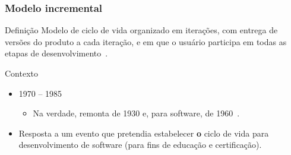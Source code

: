 \begin{frame}[parent={ie:agenda}, hasnext=true, hasprev=false]
	\frametitle{Modelo incremental}

	\begin{block:concept}{Definição}
		Modelo de ciclo de vida organizado em iterações, com entrega de versões do
		produto a cada iteração, e em que o usuário participa em todas as
		etapas de desenvolvimento~\cite{Zurcher-Randel:1968, Basili-Turner:1975, Gilb:1981, McCracken-Jackson:1982, Gilb:1985}.
	\end{block:concept}
	
	\begin{block:fact}{Contexto}
		\begin{itemize}
			\item 1970 -- 1985
			\begin{itemize}
				\item Na verdade, remonta de 1930 e, para software, de 1960~\cite{Larman-Basili:2003}.
			\end{itemize}
			
			\item Resposta a um evento que pretendia estabelecer \textbf{o} ciclo de
			vida para desenvolvimento de software (para fins de educação e certificação).
		\end{itemize}
	\end{block:fact}
	
\end{frame}


